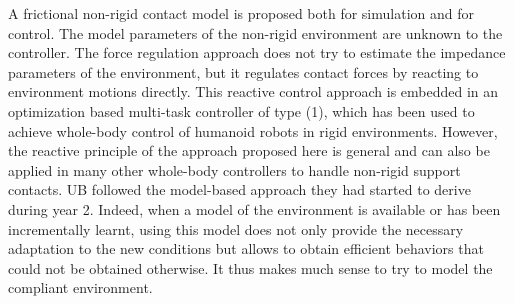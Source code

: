 A frictional non-rigid contact model is proposed both for simulation and for control. The model parameters of the non-rigid environment are unknown to the controller. The force regulation approach does not try to estimate the impedance parameters of the environment, but it regulates contact forces by reacting to environment motions directly. This reactive control approach is embedded in an optimization based multi-task controller of type (1), which has been used to achieve whole-body control of humanoid robots in rigid environments. However, the reactive principle of the approach proposed here is general and can also be applied in many other whole-body controllers to handle non-rigid support contacts. UB followed the model-based approach they had started to derive during year 2. Indeed, when a model of the environment is available or has been incrementally learnt, using this model does not only provide the necessary adaptation to the new conditions but allows to obtain efficient behaviors that could not be obtained otherwise. It thus makes much sense to try to model the compliant environment.\\

